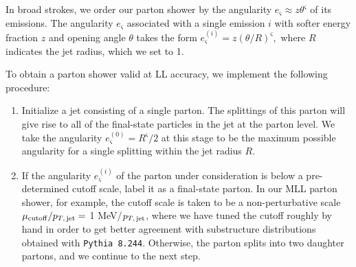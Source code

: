 In broad strokes, we order our parton shower by the angularity \(e_\varsigma \approx z \theta^\varsigma\) of its emissions.
%
The angularity \(e_\varsigma\) associated with a single emission \(i\) with softer energy fraction \(z\) and opening angle \(\theta\) takes the form
\(
    e^{(i)}_\varsigma = z \left(\theta/R\right)^\varsigma
    ,
\)
where \(R\) indicates the jet radius, which we set to 1.

To obtain a parton shower valid at LL accuracy, we implement the following procedure:
\begin{enumerate}
    \item
    \label{item:LL_ps_start}
    Initialize a jet consisting of a single parton.
    The splittings of this parton will give rise to all of the final-state particles in the jet at the parton level.
    We take the angularity \(e^{(0)}_\varsigma = R^\varsigma / 2\) at this stage to be the maximum possible angularity for a single splitting within the jet radius \(R\).

    \item
    \label{item:cutoff}
    If the angularity \(e^{(i)}_\varsigma\) of the parton under consideration is below a pre-determined cutoff scale, label it as a final-state parton.
    In our MLL parton shower, for example, the cutoff scale is taken to be a non-perturbative scale \(\mu_{\rm cutoff}/ p_{T,\,{\rm jet}} = \) 1 MeV/\(p_{T,\,{\rm jet}}\), where we have tuned the cutoff roughly by hand in order to get better agreement with substructure distributions obtained with \texttt{Pythia 8.244}.
    Otherwise, the parton splits into two daughter partons, and we continue to the next step.


\end{enumerate}

